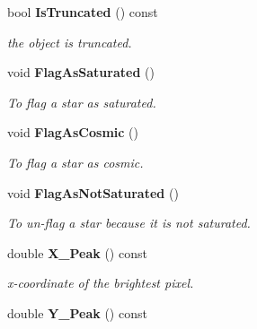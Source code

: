\begin{CompactItemize}
\item 
{}
bool {\bf Is\-Truncated} () const\label{class_sestar_a8}

\begin{CompactList}\small\item\em the object is truncated.\item\end{CompactList}\item 
{}
void {\bf Flag\-As\-Saturated} ()\label{class_sestar_a9}

\begin{CompactList}\small\item\em To flag a star as saturated.\item\end{CompactList}\item 
{}
void {\bf Flag\-As\-Cosmic} ()\label{class_sestar_a10}

\begin{CompactList}\small\item\em To flag a star as cosmic.\item\end{CompactList}\item 
{}
void {\bf Flag\-As\-Not\-Saturated} ()\label{class_sestar_a11}

\begin{CompactList}\small\item\em To un-flag a star because it is not saturated.\item\end{CompactList}\item 
{}
double {\bf X\_\-Peak} () const\label{class_sestar_a12}

\begin{CompactList}\small\item\em x-coordinate of the brightest pixel.\item\end{CompactList}\item 
{}
double {\bf Y\_\-Peak} () const\label{class_sestar_a13}


\end{CompactItemize}
